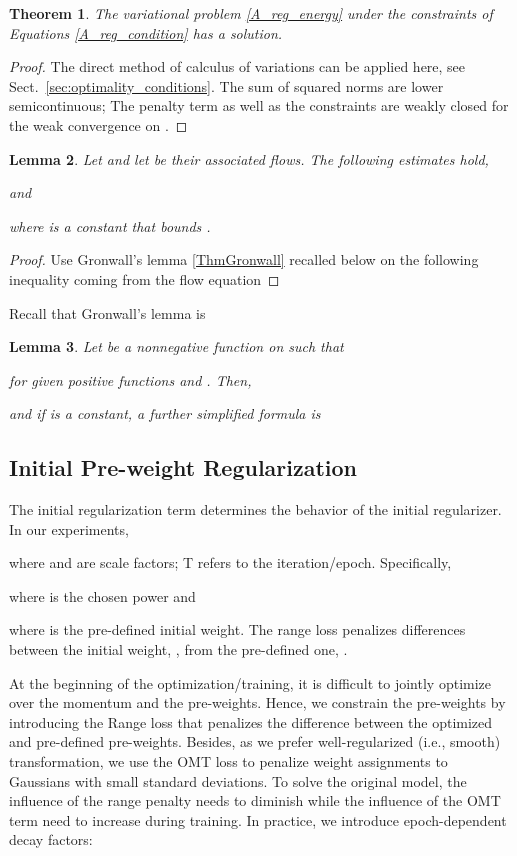 \documentclass{article}
\numberwithin{equation}{section}
\newtheorem{theorem}{Theorem}
\newtheorem{lemma}[theorem]{Lemma}
\newcommand{\ie}{{i.e.}}
\begin{document}
\begin{theorem}
The variational problem \eqref{A_reg_energy} under the constraints of Equations \eqref{A_reg_condition} has a solution.
\end{theorem}

\begin{proof}
The direct method of calculus of variations can be applied here, see Sect.~\ref{sec:optimality_conditions}. The sum of squared norms are lower semicontinuous; The penalty term as well as the constraints are weakly closed for the weak convergence on .
\end{proof}

\begin{lemma}
Let  and let  be their associated flows. The following estimates hold,

and 

where  is a constant that bounds .
\end{lemma}


\begin{proof}
Use Gronwall's lemma \eqref{ThmGronwall} recalled below on the following inequality coming from the flow equation

\end{proof}


Recall that Gronwall's lemma is 
\begin{lemma}\label{ThmGronwall}
Let  be a nonnegative function on  such that 

for given positive functions  and .
Then, 

and if  is a constant, a further simplified formula is

\end{lemma}

\subsection {Initial Pre-weight Regularization}\label{sec:initial_reg}
The initial regularization term  determines the behavior of the initial regularizer. In our experiments, 

where  and  are scale factors; T refers to the iteration/epoch. Specifically,

where  is the chosen power and

where  is the pre-defined initial weight. The range loss penalizes differences between the initial weight, , from the pre-defined one, .

At the beginning of the optimization/training, it is difficult to jointly optimize over the momentum and the pre-weights. Hence, we constrain the pre-weights by introducing the Range loss that penalizes the difference between the optimized and pre-defined pre-weights. Besides, as we prefer well-regularized (\ie, smooth) transformation, we use the OMT loss to penalize weight assignments to Gaussians with small standard deviations. To solve the original model, the influence of the range penalty needs to diminish while the influence of the OMT term need to increase during training. In practice, we introduce epoch-dependent decay factors:
 
\end{document}
